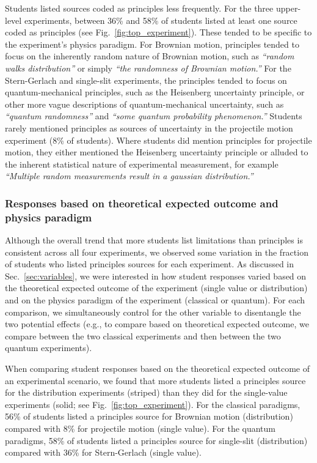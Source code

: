 \documentclass[english,aps,prstper,reprint,showpacs,longbibliography,superscriptaddress,nofootinbib]{revtex4-2}
\begin{document}
Students listed sources coded as principles less frequently. For the three upper-level experiments, between 36\% and 58\% of students listed at least one source coded as principles (see Fig.~\ref{fig:top_experiment}). These tended to be specific to the experiment's physics paradigm. For Brownian motion, principles tended to focus on the inherently random nature of Brownian motion, such as \textit{``random walks distribution''} or simply \textit{``the randomness of Brownian motion.''} For the Stern-Gerlach and single-slit experiments, the principles tended to focus on quantum-mechanical principles, such as the Heisenberg uncertainty principle, or other more vague descriptions of quantum-mechanical uncertainty, such as \textit{``quantum randomness''} and \textit{``some quantum probability phenomenon.''} Students rarely mentioned principles as sources of uncertainty in the projectile motion experiment (8\% of students). Where students did mention principles for projectile motion, they either mentioned the Heisenberg uncertainty principle or alluded to the inherent statistical nature of experimental measurement, for example \textit{``Multiple random measurements result in a gaussian distribution.''}


\subsubsection{Responses based on theoretical expected outcome and physics paradigm}

Although the overall trend that more students list limitations than principles is consistent across all four experiments, we observed some variation in the fraction of students who listed principles sources for each experiment. As discussed in Sec.~\ref{sec:variables}, we were interested in how student responses varied based on the theoretical expected outcome of the experiment (single value or distribution) and on the physics paradigm of the experiment (classical or quantum). For each comparison, we simultaneously control for the other variable to disentangle the two potential effects (e.g., to compare based on theoretical expected outcome, we compare between the two classical experiments and then between the two quantum experiments).

When comparing student responses based on the theoretical expected outcome of an experimental scenario, we found that more students listed a principles source for the distribution experiments (striped) than they did for the single-value experiments (solid; see Fig.~\ref{fig:top_experiment}).  For the classical paradigms, 56\% of students listed a principles source for Brownian motion (distribution) compared with 8\% for projectile motion (single value). For the quantum paradigms, 58\% of students listed a principles source for single-slit (distribution) compared with 36\% for Stern-Gerlach (single value). 
\end{document}
